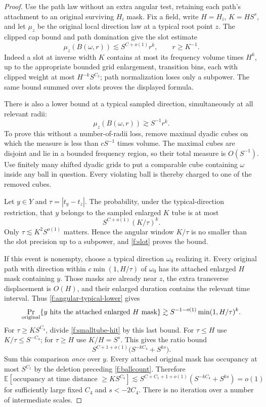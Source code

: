 \begin{proof}
Use the path law without an extra angular test, retaining each
path's attachment to an original surviving $H_i$ mask. Fix a field,
write $H=H_i$, $K=HS^s$, and let $\mu_z$ be the original local
direction law at a typical root point $z$. The clipped cap bound
and path domination give the slot estimate
\begin{equation}\label{f:slot}
 \mu_z(B(\omega,r))\lesssim S^{C+o(1)}r^k,
 \qquad r\ge K^{-1}.
\end{equation}
Indeed a slot at inverse width $K$ contains at most its frequency
volume times $H^k$, up to the appropriate bounded grid enlargement,
transition bins, each with clipped weight at most $H^{-k}S^{C_3}$;
path normalization loses only a subpower. The same bound summed
over slots proves the displayed formula.

There is also a lower bound at a typical sampled direction,
simultaneously at all relevant radii:
\begin{equation}\label{f:angular-typical-lower}
 \mu_z(B(\omega,r))\gtrsim S^{-1}r^k.
\end{equation}
To prove this without a number-of-radii loss, remove maximal
dyadic cubes on which the measure is less than $cS^{-1}$ times
volume. The maximal cubes are disjoint and lie in a bounded
frequency region, so their total measure is $O(S^{-1})$.
Use finitely many shifted dyadic grids to put a comparable cube
containing $\omega$ inside any ball in question. Every violating
ball is thereby charged to one of the removed cubes.

Let $y\in Y$ and $\tau=|t_y-t_z|$. The probability, under the
typical-direction restriction, that $y$ belongs to the sampled
enlarged $K$ tube is at most
\begin{equation}\label{f:smalltube-hit}
 S^{C+o(1)}(K/\tau)^k.
\end{equation}
Only $\tau\lesssim K^2S^{o(1)}$ matters. Hence the angular window
$K/\tau$ is no smaller than the slot precision up to a subpower,
and \eqref{f:slot} proves the bound.

If this event is nonempty, choose a typical direction $\omega_0$
realizing it. Every original path with direction within
$c\min(1,H/\tau)$ of $\omega_0$ has its attached enlarged $H$ mask
containing $y$. Those masks are already near $z$, the extra
transverse displacement is $O(H)$, and their enlarged duration
contains the relevant time interval. Thus
\eqref{f:angular-typical-lower} gives
\[
 \Pr_{\rm original}\{y\text{ hits the attached enlarged }H\text{ mask}\}
 \gtrsim S^{-1-o(1)}\min(1,H/\tau)^k.
\]
For $\tau\ge KS^{C_4}$, divide \eqref{f:smalltube-hit} by this
last bound. For $\tau\le H$ use $K/\tau\le S^{-C_4}$; for
$\tau\ge H$ use $K/H=S^s$. This gives the ratio bound
\[
 S^{C+1+o(1)}\big(S^{-kC_4}+S^{ks}\big).
\]
Sum this comparison \emph{once} over $y$. Every attached original
mask has occupancy at most $S^{C_1}$ by the deletion preceding
\eqref{f:ballcount}. Therefore
\[
 \mathbb E[\text{occupancy at time distance }\ge KS^{C_4}]
 \lesssim S^{C+C_1+1+o(1)}
                    (S^{-kC_4}+S^{ks})=o(1)
\]
for sufficiently large fixed $C_4$ and $s<-2C_4$. There is no
iteration over a number of intermediate scales.


\end{proof}
